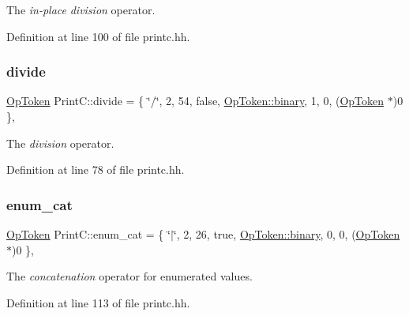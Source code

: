 The {\itshape in-\/place} {\itshape division} operator. 



Definition at line 100 of file printc.\+hh.

\mbox{\label{class_print_c_a28bc4b767b118dfad5f43aaadb10eaf4}} 
\subsubsection{\texorpdfstring{divide}{divide}}
{\footnotesize\ttfamily \mbox{\hyperlink{class_op_token}{Op\+Token}} Print\+C\+::divide = \{ \char`\"{}/\char`\"{}, 2, 54, false, \mbox{\hyperlink{class_op_token_af41c7f108d5662ede7765c5a6c44eaffa3a2ec63522a9329a71ddbe8adc3e752d}{Op\+Token\+::binary}}, 1, 0, (\mbox{\hyperlink{class_op_token}{Op\+Token}} $\ast$)0 \}\hspace{0.3cm}{\ttfamily [static]}, {\ttfamily [protected]}}



The {\itshape division} operator. 



Definition at line 78 of file printc.\+hh.

\mbox{\label{class_print_c_a5b018e8ef4c8150a9f9981efef4e3c80}} 
\subsubsection{\texorpdfstring{enum\_cat}{enum\_cat}}
{\footnotesize\ttfamily \mbox{\hyperlink{class_op_token}{Op\+Token}} Print\+C\+::enum\+\_\+cat = \{ \char`\"{}$\vert$\char`\"{}, 2, 26, true, \mbox{\hyperlink{class_op_token_af41c7f108d5662ede7765c5a6c44eaffa3a2ec63522a9329a71ddbe8adc3e752d}{Op\+Token\+::binary}}, 0, 0, (\mbox{\hyperlink{class_op_token}{Op\+Token}} $\ast$)0 \}\hspace{0.3cm}{\ttfamily [static]}, {\ttfamily [protected]}}



The {\itshape concatenation} operator for enumerated values. 



Definition at line 113 of file printc.\+hh.

\mbox{\label{class_print_c_a9c4f177aa95f33e2a9d4c2f35eb9f10e}} 
